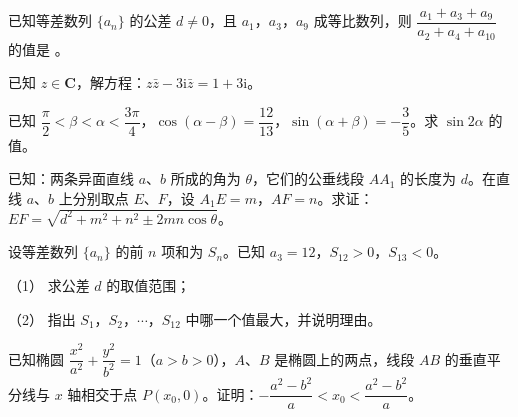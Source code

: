 \begin{question}
已知等差数列 \(\{a_n\}\) 的公差 \(d\neq0\)，且 \(a_1\)，\(a_3\)，\(a_9\) 成等比数列，则 \(\dfrac{a_1+a_3+a_9}{a_2+a_4+a_{10}}\) 的值是 \underline{\qquad}。

\end{question}
\begin{question}
已知 \(z\in\mathbf{C}\)，解方程：\(z\bar z-3\mathrm{i}\bar z=1+3\mathrm{i}\)。

\end{question}
\begin{question}
已知 \(\dfrac{\pi}{2}<\beta<\alpha<\dfrac{3\pi}{4}\)，\(\cos(\alpha-\beta)=\dfrac{12}{13}\)，\(\sin(\alpha+\beta)=-\dfrac{3}{5}\)。求 \(\sin 2\alpha\) 的值。

\end{question}
\begin{question}
已知：两条异面直线 \(a\)、\(b\) 所成的角为 \(\theta\)，它们的公垂线段 \(AA_1\) 的长度为 \(d\)。在直线 \(a\)、\(b\) 上分别取点 \(E\)、\(F\)，设 \(A_1E=m\)，\(AF=n\)。求证：\(EF=\sqrt{d^{2}+m^{2}+n^{2}\pm 2mn\cos\theta}\)。

\end{question}
\begin{question}
设等差数列 \(\{a_n\}\) 的前 \(n\) 项和为 \(S_n\)。已知 \(a_3=12\)，\(S_{12}>0\)，\(S_{13}<0\)。

（1） 求公差 \(d\) 的取值范围；

（2） 指出 \(S_1\)，\(S_2\)，\(\cdots\)，\(S_{12}\) 中哪一个值最大，并说明理由。

\end{question}
\begin{question}
已知椭圆 \(\dfrac{x^{2}}{a^{2}}+\dfrac{y^{2}}{b^{2}}=1\)（\(a>b>0\)），\(A\)、\(B\) 是椭圆上的两点，线段 \(AB\) 的垂直平分线与 \(x\) 轴相交于点 \(P(x_0,0)\)。证明：\(-\dfrac{a^{2}-b^{2}}{a}<x_0<\dfrac{a^{2}-b^{2}}{a}\)。

\end{question}